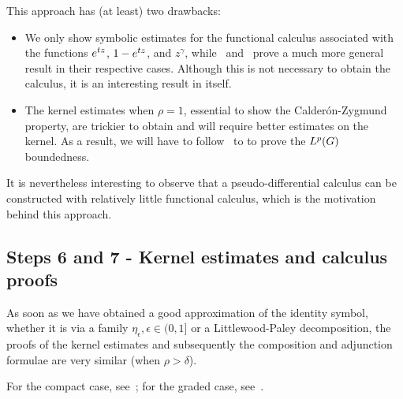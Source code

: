 This approach has (at least) two drawbacks:
\begin{itemize}
    \item
        We only show symbolic estimates for the functional calculus associated with the functions $e^{t z}$,
        $1 - e^{t z}$, and $z^\gamma$,
        while~\cite{FischerRuzhansky16} and~\cite{Fischer2015} prove a much more general result in their respective cases.
        Although this is not necessary to obtain the calculus,
        it is an interesting result in itself.
    \item
        The kernel estimates when $\rho = 1$,
        essential to show the Calder\'on-Zygmund property,
        are trickier to obtain
        and will require better estimates on the kernel.
        As a result,
        we will have to follow~\cite{Fischer2015} to
        to prove the ${L^{p} (G)}$ boundedness.
\end{itemize}

It is nevertheless interesting to observe that a pseudo-differential calculus can be constructed with relatively little functional calculus,
which is the motivation behind this approach.

\subsection*{Steps 6 and 7 - Kernel estimates and calculus proofs}

As soon as we have obtained a good approximation of the identity symbol,
whether it is via a family $\eta_\epsilon, \epsilon \in (0, 1]$
or a Littlewood-Paley decomposition,
the proofs of the kernel estimates and subsequently the composition and adjunction formulae are very similar (when $\rho > \delta$).

For the compact case,
see~\cite[Sections 6.3 and 7.3]{Fischer2015};
for the graded case,
see~\cite[Sections 5.4 and 5.5]{FischerRuzhansky16}.
